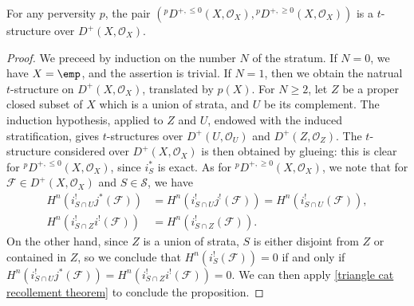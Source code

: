 \begin{proposition}\label{triangle cat perverse t-structure on D^+}
For any perversity $p$, the pair $({^pD^{+,\leq 0}}(X,\mathscr{O}_X),{^pD^{+,\geq 0}}(X,\mathscr{O}_X))$ is a $t$-structure over $D^+(X,\mathscr{O}_X)$.
\end{proposition}
\begin{proof}
We preceed by induction on the number $N$ of the stratum. If $N=0$, we have $X=\emp$, and the assertion is trivial. If $N=1$, then we obtain the natrual $t$-structure on $D^+(X,\mathscr{O}_X)$, translated by $p(X)$. For $N\geq 2$, let $Z$ be a proper closed subset of $X$ which is a union of strata, and $U$ be its complement. The induction hypothesis, applied to $Z$ and $U$, endowed with the induced stratification, gives $t$-structures over $D^+(U,\mathscr{O}_U)$ and $D^+(Z,\mathscr{O}_Z)$. The $t$-structure considered over $D^+(X,\mathscr{O}_X)$ is then obtained by glueing: this is clear for ${^pD^{+,\leq 0}}(X,\mathscr{O}_X)$, since $i_S^*$ is exact. As for ${^pD^{+,\geq 0}}(X,\mathscr{O}_X)$, we note that for $\mathscr{F}\in D^+(X,\mathscr{O}_X)$ and $S\in\mathcal{S}$, we have
\begin{align*}
H^n(i_{S\cap U}^!j^*(\mathscr{F}))&=H^n(i_{S\cap U}^!j^!(\mathscr{F}))=H^n(i_{S\cap U}^!(\mathscr{F})),\\
H^n(i_{S\cap Z}^!i^!(\mathscr{F}))&=H^n(i_{S\cap Z}^!(\mathscr{F})).
\end{align*}
On the other hand, since $Z$ is a union of strata, $S$ is either disjoint from $Z$ or contained in $Z$, so we conclude that $H^n(i_S^!(\mathscr{F}))=0$ if and only if $H^n(i_{S\cap U}^!j^*(\mathscr{F}))=H^n(i_{S\cap Z}^!i^!(\mathscr{F}))=0$. We can then apply \cref{triangle cat recollement theorem} to conclude the proposition.
\end{proof}

